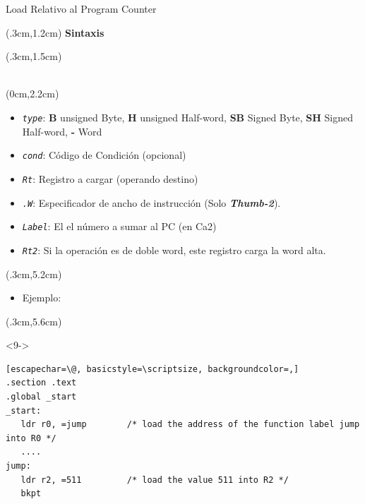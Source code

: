 \documentclass[usenames,table,dvipsnames,aspectratio=169]{beamer}
\newcommand{\Thdos}{\textbf{\textit{Thumb-2}}}
\begin{document}
\begin{frame}[fragile]{Load Relativo al Program Counter}
\footnotesize
 \begin{textblock*}{\textwidth}(.3cm,1.2cm)
 \textbf{Sintaxis}
 \end{textblock*}
 \begin{textblock*}{\textwidth}(.3cm,1.5cm)
  \ttfamily \obeyspaces
  \\
  \\
 \end{textblock*}
 \begin{textblock*}{\textwidth}(0cm,2.2cm)
  \begin{itemize}
   \item<3-> []\textit{\texttt{type}}: \textbf{B} unsigned Byte, \textbf{H} unsigned Half-word, \textbf{SB} Signed Byte, \textbf{SH} Signed Half-word, \textbf{-} Word
   \item<4-> [] \texttt{\textit{cond}}:  Código de Condición (opcional)
   \item<5-> [] \texttt{\textit{Rt}}:    Registro a cargar (operando destino)
   \item<6-> [] \textit{\texttt{.W}}:    Especificador de ancho de instrucción (Solo \Thdos).
   \item<7-> [] \textit{\texttt{Label}}: El el número a sumar al PC (en Ca2)
   \item<8-> [] \texttt{\textit{Rt2}}:   Si la operación es de doble word, este registro carga la word alta.
  \end{itemize}
 \end{textblock*}
 \begin{textblock*}{\textwidth}(.3cm,5.2cm)
  \begin{itemize}
   \item<9-> [] Ejemplo:
   \end{itemize}
  \end{textblock*}
  \begin{textblock*}{\textwidth}(.3cm,5.6cm)
   \begin{onlyenv}<9->
    \begin{lstlisting}[escapechar=\@, basicstyle=\scriptsize, backgroundcolor=,]
.section .text
.global _start
_start:
   ldr r0, =jump        /* load the address of the function label jump into R0 */
   ....
jump:
   ldr r2, =511         /* load the value 511 into R2 */ 
   bkpt
   \end{lstlisting}
  \end{onlyenv}
 \end{textblock*}
\end{frame}
\end{document}
